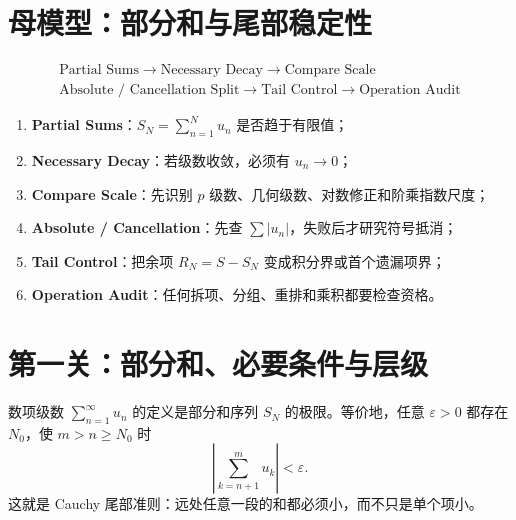 \documentclass[11pt,a4paper,fontset=fandol]{ctexart}
\newcommand{\kw}[1]{\textbf{\color{deep}#1}}
\begin{document}
\section{母模型：部分和与尾部稳定性}
\[
\boxed{\begin{gathered}
\text{Partial Sums}\to\text{Necessary Decay}\to\text{Compare Scale}\\
\text{Absolute / Cancellation Split}\to\text{Tail Control}\to\text{Operation Audit}
\end{gathered}}
\]
\begin{enumerate}
  \item \kw{Partial Sums}：$S_N=\sum_{n=1}^{N}u_n$ 是否趋于有限值；
  \item \kw{Necessary Decay}：若级数收敛，必须有 $u_n\to0$；
  \item \kw{Compare Scale}：先识别 $p$ 级数、几何级数、对数修正和阶乘指数尺度；
  \item \kw{Absolute / Cancellation}：先查 $\sum|u_n|$，失败后才研究符号抵消；
  \item \kw{Tail Control}：把余项 $R_N=S-S_N$ 变成积分界或首个遗漏项界；
  \item \kw{Operation Audit}：任何拆项、分组、重排和乘积都要检查资格。
\end{enumerate}

\begin{center}
\end{center}

\section{第一关：部分和、必要条件与层级}
数项级数 $\sum_{n=1}^{\infty}u_n$ 的定义是部分和序列 $S_N$ 的极限。等价地，任意 $\varepsilon>0$ 都存在 $N_0$，使 $m>n\ge N_0$ 时
\[
\left|\sum_{k=n+1}^{m}u_k\right|<\varepsilon.
\]
这就是 Cauchy 尾部准则：远处任意一段的和都必须小，而不只是单个项小。
\end{document}
